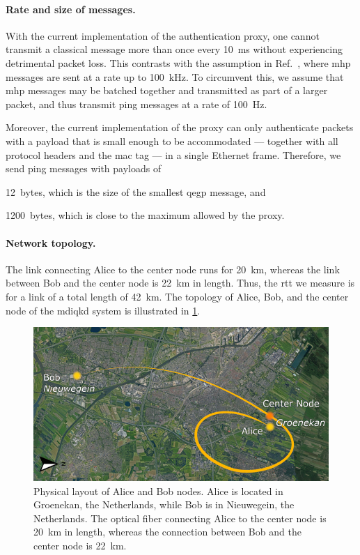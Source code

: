 \paragraph*{Rate and size of messages.}

With the current implementation of the authentication proxy, one cannot transmit a classical message
more than once every \qty{10}{\ms} without experiencing detrimental packet loss. This contrasts with
the assumption in Ref.~\cite{dahlberg_2019_egp}, where \acrshort{mhp} messages are sent at a rate up
to \qty{100}{\kHz}. To circumvent this, we assume that \acrshort{mhp} messages may be batched
together and transmitted as part of a larger packet, and thus transmit ping messages at a rate of
\qty{100}{\Hz}.

Moreover, the current implementation of the proxy can only authenticate packets with a payload that
is small enough to be accommodated --- together with all protocol headers and the \acrshort{mac} tag
--- in a single Ethernet frame. Therefore, we send ping messages with payloads of
%
\begin{inlinelist}
    \item \num{12}~bytes, which is the size of the smallest \acrshort{qegp} message, and
    \item \num{1200}~bytes, which is close to the maximum allowed by the proxy.
\end{inlinelist}

\paragraph*{Network topology.}

The link connecting Alice to the center node runs for \qty{20}{\km}, whereas the link between Bob
and the center node is \qty{22}{\km} in length. Thus, the \acrshort{rtt} we measure is for a link of
a total length of \qty{42}{\km}. The topology of Alice, Bob, and the center node of the
\acrshort{mdiqkd} system is illustrated in \cref{fig:mac-setup-qkd-locations}.

\begin{figure}[t]
    \centering
    \includegraphics[width=0.6\linewidth]{figures/mac-setup-qkd-locations-resized.png}
    \caption{
        Physical layout of Alice and Bob nodes. Alice is located in Groenekan, the Netherlands,
        while Bob is in Nieuwegein, the Netherlands. The optical fiber connecting Alice to the
        center node is \qty{20}{\km} in length, whereas the connection between Bob and the center
        node is \qty{22}{\km}.
    }
    \label{fig:mac-setup-qkd-locations}
\end{figure}

